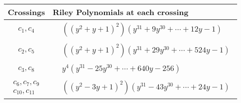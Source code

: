 \documentclass[1p]{elsarticle_modified}
\theoremstyle{definition}
\begin{document}
\begin{tabular}{m{50pt}|m{274pt}}
Crossings & \hspace{64pt}Riley Polynomials at each crossing \\
\hline $$\begin{aligned}c_{1},c_{4}\end{aligned}$$&$\begin{aligned}
&((y^2+y+1)^2)(y^{31}+9 y^{30}+\cdots+12 y-1)
\end{aligned}$\\
\hline $$\begin{aligned}c_{2},c_{5}\end{aligned}$$&$\begin{aligned}
&((y^2+y+1)^2)(y^{31}+29 y^{30}+\cdots+524 y-1)
\end{aligned}$\\
\hline $$\begin{aligned}c_{3},c_{8}\end{aligned}$$&$\begin{aligned}
&y^4(y^{31}-25 y^{30}+\cdots+640 y-256)
\end{aligned}$\\
\hline $$\begin{aligned}c_{6},c_{7},c_{9}\\c_{10},c_{11}\end{aligned}$$&$\begin{aligned}
&((y^2-3 y+1)^2)(y^{31}-43 y^{30}+\cdots+24 y-1)
\end{aligned}$\\
\hline
\end{tabular}
\vskip 2pc
\end{document}

